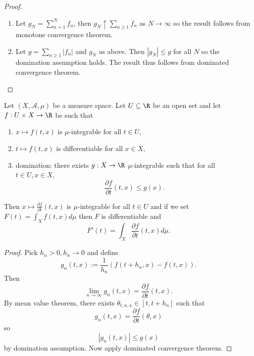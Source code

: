 \documentclass[a4paper]{article}
\begin{document}
\begin{proof}\leavevmode
  \begin{enumerate}
  \item Let \(g_N = \sum_{n = 1}^N f_n\), then \(g_N \uparrow \sum_{n \geq 1} f_n\) as \(N \to \infty\) so the result follows from monotone convergence theorem.
  \item Let \(g = \sum_{n \geq 1} |f_n|\) and \(g_N\) as above. Then \(|g_N| \leq g\) for all \(N\) so the domination assumption holds. The result thus follows from dominated convergence theorem.
  \end{enumerate}
\end{proof}

\begin{corollary}
  Let \((X, \mathcal A, \mu)\) be a measure space. Let \(U \subseteq \R\) be an open set and let \(f: U \times X \to \R\) be such that
  \begin{enumerate}
  \item \(x \mapsto f(t, x)\) is \(\mu\)-integrable for all \(t \in U\),
  \item \(t \mapsto f(t, x)\) is differentiable for all \(x \in X\),
  \item domination: there exists \(g: X \to \R\) \(\mu\)-integrable such that for all \(t \in U, x \in X\),
    \[
      \frac{\partial f}{\partial t} (t, x) \leq g(x).
    \]
  \end{enumerate}
  Then \(x \mapsto \frac{\partial f}{\partial t}(t, x)\) is \(\mu\)-integrable for all \(t \in U\) and if we set \(F(t) = \int_X f(t, x) d\mu\) then \(F\) is differentiable and 
  \[
    F'(t) = \int_X \frac{\partial f}{\partial t}(t, x) d\mu.
  \]
\end{corollary}

\begin{proof}
  Pick \(h_n > 0, h_n \to 0\) and define
  \[
    g_n(t, x) := \frac{1}{h_n} (f(t + h_n, x) - f(t, x)).
  \]
  Then
  \[
    \lim_{n \to \infty} g_n(t, x) = \frac{\partial f}{\partial t}(t, x).
  \]
  By mean value theorem, there exists \(\theta_{t, n, x} \in [t, t + h_n]\) such that
  \[
    g_n(t, x) = \frac{\partial f}{\partial t}(\theta, x)
  \]
  so
  \[
    |g_n(t, x)| \leq g(x)
  \]
  by domination assumption. Now apply dominated convergence theorem.
\end{proof}
\end{document}
